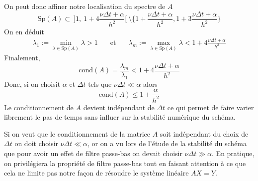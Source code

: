 On peut donc affiner notre localisation du spectre de $A$
\begin{equation*}
    \mathrm{Sp}(A) \subset \  \Big]1, \ 1+4\frac{\nu\Delta t+\alpha}{h^2}\Big[ \ \setminus \Big\{1+\frac{\nu\Delta t+\alpha}{h^2}, 1+3\frac{\nu\Delta t+\alpha}{h^2} \Big\}
\end{equation*}
On en déduit 
\begin{eqnarray*}
    \lambda_1 := \min_{\lambda \in \mathrm{Sp}(A)} \lambda > 1 \ \ \ &\text{ et }& \ \ \ \lambda_m :=\max_{\lambda \in \mathrm{Sp}(A)} \lambda < 1+4\frac{\nu\Delta t+\alpha}{h^2}
\end{eqnarray*}
Finalement,
\begin{equation*}
    \mathrm{cond}(A) = \frac{\lambda_m}{\lambda_1} < 1+4\frac{\nu \Delta t +\alpha}{h^2}
\end{equation*}
Donc, si on choisit $\alpha$ et $\Delta t$ tels que $\nu \Delta t \ll \alpha$ alors 
\begin{equation*}
    \mathrm{cond}(A) \leq 1 + \frac{\alpha}{h^2}
\end{equation*}
Le conditionnement de $A$ devient indépendant de $\Delta t$ ce qui permet de faire varier librement le pas de temps sans influer sur la stabilité numérique du schéma.
\begin{remark}
     Si on veut que le conditionnement de la matrice $A$ soit indépendant du choix de $\Delta t$ on doit choisir $\nu \Delta t \ll \alpha$, or on a vu lors de l'étude de la stabilité du schéma que pour avoir un effet de filtre passe-bas on devait choisir $\nu \Delta t \gg \alpha$. En pratique, on privilégiera la propriété de filtre passe-bas tout en faisant attention à ce que cela ne limite pas notre façon de résoudre le système linéaire $AX=Y$.
\end{remark}

